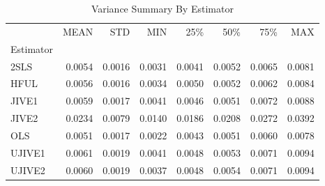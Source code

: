 \begin{table}[ht]
\centering
\caption{Variance Summary By Estimator}
\begin{tabular}{lrrrrrrr}
\toprule
 & MEAN & STD & MIN & 25\% & 50\% & 75\% & MAX \\
Estimator &  &  &  &  &  &  &  \\
\midrule
2SLS & 0.0054 & 0.0016 & 0.0031 & 0.0041 & 0.0052 & 0.0065 & 0.0081 \\
HFUL & 0.0056 & 0.0016 & 0.0034 & 0.0050 & 0.0052 & 0.0062 & 0.0084 \\
JIVE1 & 0.0059 & 0.0017 & 0.0041 & 0.0046 & 0.0051 & 0.0072 & 0.0088 \\
JIVE2 & 0.0234 & 0.0079 & 0.0140 & 0.0186 & 0.0208 & 0.0272 & 0.0392 \\
OLS & 0.0051 & 0.0017 & 0.0022 & 0.0043 & 0.0051 & 0.0060 & 0.0078 \\
UJIVE1 & 0.0061 & 0.0019 & 0.0041 & 0.0048 & 0.0053 & 0.0071 & 0.0094 \\
UJIVE2 & 0.0060 & 0.0019 & 0.0037 & 0.0048 & 0.0054 & 0.0071 & 0.0094 \\
\bottomrule
\end{tabular}
\end{table}
